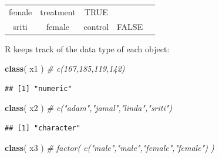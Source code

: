 \documentclass[]{book}
\newenvironment{Shaded}{\begin{snugshade}}{\end{snugshade}}
\newcommand{\CommentTok}[1]{\textcolor[rgb]{0.56,0.35,0.01}{\textit{#1}}}
\newcommand{\KeywordTok}[1]{\textcolor[rgb]{0.13,0.29,0.53}{\textbf{#1}}}
\newcommand{\NormalTok}[1]{#1}
\theoremstyle{definition}
\theoremstyle{definition}
\theoremstyle{definition}
\theoremstyle{remark}
\begin{document}
\begin{longtable}[]{@{}ccccc@{}}
\begin{minipage}[t]{0.11\columnwidth}
female\strut
\end{minipage} & \begin{minipage}[t]{0.14\columnwidth}\centering
treatment\strut
\end{minipage} & \begin{minipage}[t]{0.13\columnwidth}\centering
TRUE\strut
\end{minipage} & \begin{minipage}[t]{0.13\columnwidth}\centering
119\strut
\end{minipage}\tabularnewline
\begin{minipage}[t]{0.10\columnwidth}\centering
sriti\strut
\end{minipage} & \begin{minipage}[t]{0.11\columnwidth}\centering
female\strut
\end{minipage} & \begin{minipage}[t]{0.14\columnwidth}\centering
control\strut
\end{minipage} & \begin{minipage}[t]{0.13\columnwidth}\centering
FALSE\strut
\end{minipage} & \begin{minipage}[t]{0.13\columnwidth}\centering
142\strut
\end{minipage}\tabularnewline
\bottomrule
\end{longtable}

R keeps track of the data type of each object:

\begin{Shaded}
\begin{Highlighting}[]
\KeywordTok{class}\NormalTok{( x1 )   }\CommentTok{# c(167,185,119,142)}
\end{Highlighting}
\end{Shaded}

\begin{verbatim}
## [1] "numeric"
\end{verbatim}

\begin{Shaded}
\begin{Highlighting}[]
\KeywordTok{class}\NormalTok{( x2 )   }\CommentTok{# c("adam","jamal","linda","sriti")}
\end{Highlighting}
\end{Shaded}

\begin{verbatim}
## [1] "character"
\end{verbatim}

\begin{Shaded}
\begin{Highlighting}[]
\KeywordTok{class}\NormalTok{( x3 )   }\CommentTok{# factor( c("male","male","female","female") )}
\end{Highlighting}
\end{Shaded}
\end{document}
